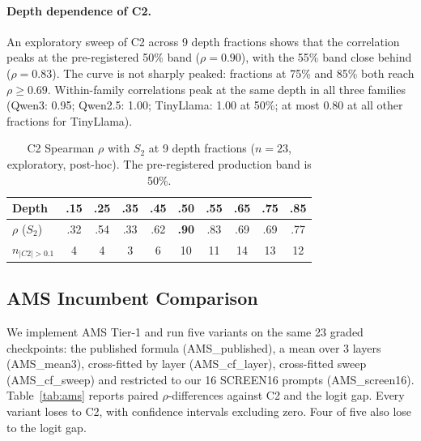 \documentclass[11pt,letterpaper]{article}
\begin{document}
\paragraph{Depth dependence of C2.}
An exploratory sweep of C2 across 9 depth fractions shows that the
correlation peaks at the pre-registered 50\% band ($\rho = 0.90$), with
the 55\% band close behind ($\rho = 0.83$). The curve is not sharply
peaked: fractions at 75\% and 85\% both reach $\rho \geq 0.69$.
Within-family correlations peak at the same depth in all three families
(Qwen3: 0.95; Qwen2.5: 1.00; TinyLlama: 1.00 at 50\%; at most 0.80 at
all other fractions for TinyLlama).

\begin{table}[!htbp]
\centering
\small
\caption{C2 Spearman $\rho$ with $S_2$ at 9 depth fractions ($n = 23$,
exploratory, post-hoc). The pre-registered production band is 50\%.}
\label{tab:depth}
\begin{tabular}{@{}lccccccccc@{}}
\toprule
Depth & .15 & .25 & .35 & .45 & \textbf{.50} & .55 & .65 & .75 & .85 \\
\midrule
$\rho$ ($S_2$)      & .32 & .54 & .33 & .62 & \textbf{.90} & .83 & .69 & .69 & .77 \\
$n_{|C2|>0.1}$ & 4 & 4 & 3 & 6 & 10 & 11 & 14 & 13 & 12 \\
\bottomrule
\end{tabular}
\end{table}

\subsection{AMS Incumbent Comparison}
\label{sec:ams}

We implement AMS Tier-1 \citep{Messenger2026} and run five variants on
the same 23 graded checkpoints: the published formula (AMS\_published), a
mean over 3 layers (AMS\_mean3), cross-fitted by layer (AMS\_cf\_layer),
cross-fitted sweep (AMS\_cf\_sweep) and restricted to our 16 SCREEN16
prompts (AMS\_screen16). Table~\ref{tab:ams} reports paired
$\rho$-differences against C2 and the logit gap. Every variant loses to
C2, with confidence intervals excluding zero. Four of five also lose to
the logit gap.
\end{document}
